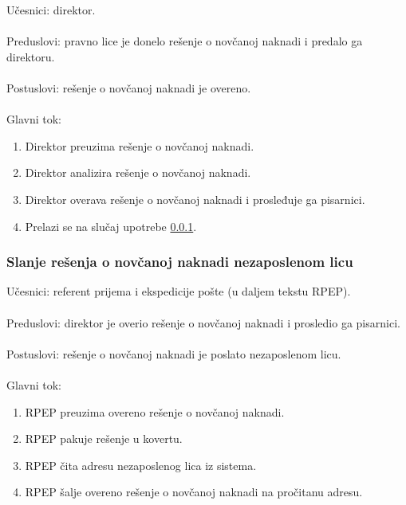 \noindent Učesnici: direktor.
\\
\\ Preduslovi: pravno lice je donelo rešenje o novčanoj naknadi i predalo ga direktoru.
\\
\\ Postuslovi: rešenje o novčanoj naknadi je overeno.
\\
\\ Glavni tok:
\begin{enumerate}
\item Direktor preuzima rešenje o novčanoj naknadi.
\item Direktor analizira rešenje o novčanoj naknadi.
\item Direktor overava rešenje o novčanoj naknadi i prosleđuje ga pisarnici.
\item Prelazi se na slu\v caj upotrebe \ref{su: pisarnica}.
\end{enumerate}


\subsubsection{Slanje rešenja o novčanoj naknadi nezaposlenom licu}
\label{su: pisarnica}

\noindent Učesnici: referent prijema i ekspedicije pošte (u daljem tekstu RPEP).
\\
\\ Preduslovi: direktor je overio rešenje o novčanoj naknadi i prosledio ga pisarnici.
\\
\\ Postuslovi: rešenje o novčanoj naknadi je poslato nezaposlenom licu.
\\
\\ Glavni tok:
\begin{enumerate}
\item RPEP preuzima overeno rešenje o novčanoj naknadi.
\item RPEP pakuje rešenje u kovertu.
\item RPEP čita adresu nezaposlenog lica iz sistema.
\item RPEP šalje overeno rešenje o novčanoj naknadi na pročitanu adresu.
\end{enumerate}


